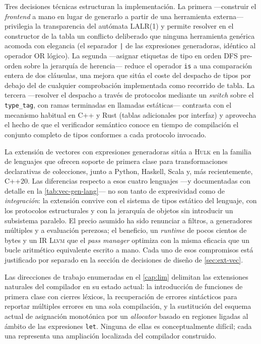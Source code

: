 \documentclass[11pt,a4paper,oneside,openany]{report}
\newcommand{\hulk}{\textsc{Hulk}}
\newcommand{\code}[1]{\texttt{#1}}
\newcommand{\llvm}{\textsc{Llvm}}
\begin{document}
Tres decisiones técnicas estructuran la implementación. La primera ---construir
el \textit{frontend} a mano en lugar de generarlo a partir de una herramienta
externa--- privilegia la transparencia del autómata LALR(1) y permite resolver
en el constructor de la tabla un conflicto deliberado que ninguna herramienta
genérica acomoda con elegancia (el separador \code{|} de las expresiones
generadoras, idéntico al operador OR lógico). La segunda ---asignar etiquetas
de tipo en orden DFS pre-orden sobre la jerarquía de herencia--- reduce el
operador \code{is} a una comparación entera de dos cláusulas, una mejora que
sitúa el coste del despacho de tipos por debajo del de cualquier comprobación
implementada como recorrido de tabla. La tercera ---resolver el despacho a
través de protocolos mediante un \textit{switch} sobre el \code{type\_tag}, con
ramas terminadas en llamadas estáticas--- contrasta con el mecanismo habitual
en C++ y Rust (tablas adicionales por interfaz) y aprovecha el hecho de que el
verificador semántico conoce en tiempo de compilación el conjunto completo de
tipos conformes a cada protocolo invocado.

La extensión de vectores con expresiones generadoras sitúa a \hulk{} en la
familia de lenguajes que ofrecen soporte de primera clase para transformaciones
declarativas de colecciones, junto a Python, Haskell, Scala y, más
recientemente, C++20. Las diferencias respecto a esos cuatro lenguajes ---y
documentadas con detalle en la \cref{tab:vec-gen-lang}--- no son tanto de
expresividad como de \emph{integración}: la extensión convive con el sistema
de tipos estático del lenguaje, con los protocolos estructurales y con la
jerarquía de objetos sin introducir un subsistema paralelo. El precio asumido
ha sido renunciar a filtros, a generadores múltiples y a evaluación perezosa;
el beneficio, un \textit{runtime} de pocos cientos de bytes y un IR \llvm{}
que el \textit{pass manager} optimiza con la misma eficacia que un bucle
aritmético equivalente escrito a mano. Cada uno de esos compromisos está
justificado por separado en la sección de decisiones de diseño de
\cref{sec:ext-vec}.

\vspace{1em}
Las direcciones de trabajo enumeradas en el \cref{cap:lim} delimitan las
extensiones naturales del compilador en su estado actual: la introducción de
funciones de primera clase con cierres léxicos, la recuperación de errores
sintácticos para reportar múltiples errores en una sola compilación, y la
sustitución del esquema actual de asignación monotónica por un
\textit{allocator} basado en regiones ligadas al ámbito de las expresiones
\code{let}. Ninguna de ellas es conceptualmente difícil; cada una representa
una ampliación localizada del compilador construido.
\end{document}
